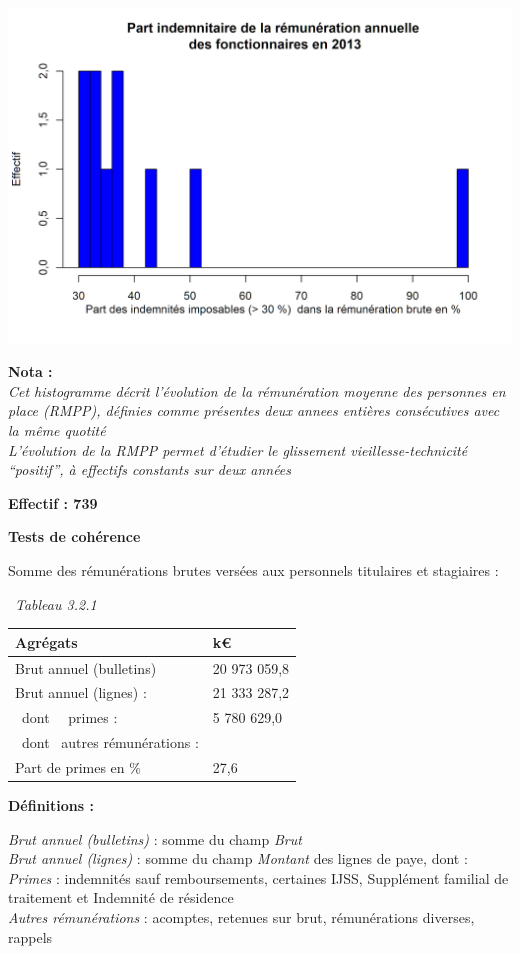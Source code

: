 \includegraphics{altair_files/figure-latex/unnamed-chunk-76-6.png}

\textbf{Nota :}\\
\emph{Cet histogramme décrit l'évolution de la rémunération moyenne des
personnes en place (RMPP), définies comme présentes deux annees entières
consécutives avec la même quotité}\\
\emph{L'évolution de la RMPP permet d'étudier le glissement
vieillesse-technicité ``positif'', à effectifs constants sur deux
années}

\textbf{Effectif : 739 }

\textbf{Tests de cohérence}

Somme des rémunérations brutes versées aux personnels titulaires et
stagiaires :

~\emph{Tableau 3.2.1}

\begin{longtable}[]{@{}ll@{}}
\toprule
Agrégats & k€\tabularnewline
\midrule
\endhead
Brut annuel (bulletins) & 20 973 059,8\tabularnewline
Brut annuel (lignes) : & 21 333 287,2\tabularnewline
~dont ~~primes : & 5 780 629,0\tabularnewline
~dont ~autres rémunérations : &\tabularnewline
Part de primes en \% & 27,6\tabularnewline
\bottomrule
\end{longtable}

\textbf{Définitions :}

\emph{Brut annuel (bulletins)} : somme du champ \emph{Brut}\\
\emph{Brut annuel (lignes)} : somme du champ \emph{Montant} des lignes
de paye, dont :\\
\emph{Primes} : indemnités sauf remboursements, certaines IJSS,
Supplément familial de traitement et Indemnité de résidence\\
\emph{Autres rémunérations} : acomptes, retenues sur brut, rémunérations
diverses, rappels

